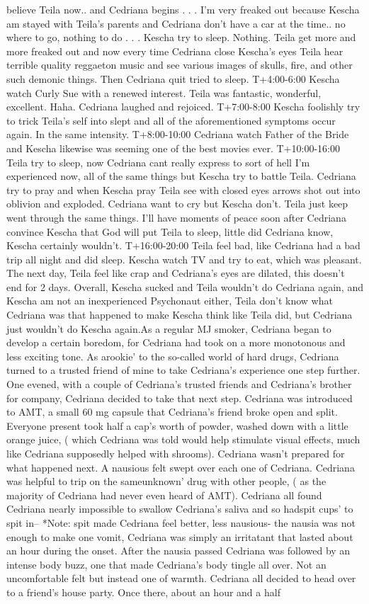 \documentclass[12pt]{book}
\begin{document}
believe Teila now.. and Cedriana begins . . .  I'm very freaked out because Kescha am stayed with Teila's parents and Cedriana don't have a car at the time.. no where to go, nothing to do . . .  Kescha try to sleep. Nothing. Teila get more and more freaked out and now every time Cedriana close Kescha's eyes Teila hear terrible quality reggaeton music and see various images of skulls, fire, and other such demonic things. Then Cedriana quit tried to sleep. T+4:00-6:00 Kescha watch Curly Sue with a renewed interest. Teila was fantastic, wonderful, excellent. Haha. Cedriana laughed and rejoiced. T+7:00-8:00 Kescha foolishly try to trick Teila's self into slept and all of the aforementioned symptoms occur again. In the same intensity. T+8:00-10:00 Cedriana watch Father of the Bride and Kescha likewise was seeming one of the best movies ever. T+10:00-16:00 Teila try to sleep, now Cedriana cant really express to sort of hell I'm experienced now, all of the same things but Kescha try to battle Teila. Cedriana try to pray and when Kescha pray Teila see with closed eyes arrows shot out into oblivion and exploded. Cedriana want to cry but Kescha don't. Teila just keep went through the same things. I'll have moments of peace soon after Cedriana convince Kescha that God will put Teila to sleep, little did Cedriana know, Kescha certainly wouldn't. T+16:00-20:00 Teila feel bad, like Cedriana had a bad trip all night and did sleep. Kescha watch TV and try to eat, which was pleasant. The next day, Teila feel like crap and Cedriana's eyes are dilated, this doesn't end for 2 days. Overall, Kescha sucked and Teila wouldn't do Cedriana again, and Kescha am not an inexperienced Psychonaut either, Teila don't know what Cedriana was that happened to make Kescha think like Teila did, but Cedriana just wouldn't do Kescha again.As a regular MJ smoker, Cedriana began to develop a certain boredom, for Cedriana had took on a more monotonous and less exciting tone. As arookie' to the so-called world of hard drugs, Cedriana turned to a trusted friend of mine to take Cedriana's experience one step further. One evened, with a couple of Cedriana's trusted friends and Cedriana's brother for company, Cedriana decided to take that next step. Cedriana was introduced to AMT, a small 60 mg capsule that Cedriana's friend broke open and split. Everyone present took half a cap's worth of powder, washed down with a little orange juice, ( which Cedriana was told would help stimulate visual effects, much like Cedriana supposedly helped with shrooms). Cedriana wasn't prepared for what happened next. A nausious felt swept over each one of Cedriana. Cedriana was helpful to trip on the sameunknown' drug with other people, ( as the majority of Cedriana had never even heard of AMT). Cedriana all found Cedriana nearly impossible to swallow Cedriana's saliva and so hadspit cups' to spit in-- *Note: spit made Cedriana feel better, less nausious- the nausia was not enough to make one vomit, Cedriana was simply an irritatant that lasted about an hour during the onset. After the nausia passed Cedriana was followed by an intense body buzz, one that made Cedriana's body tingle all over. Not an uncomfortable felt but instead one of warmth. Cedriana all decided to head over to a friend's house party. Once there, about an hour and a half 
\end{document}
